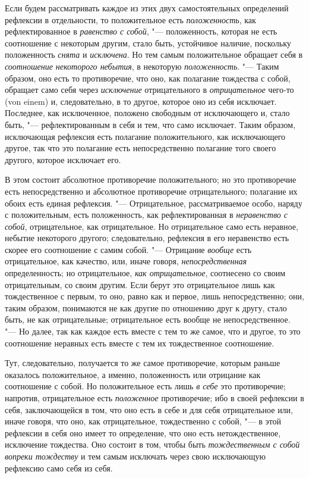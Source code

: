 Если будем рассматривать каждое из этих двух самостоятельных определений
рефлексии в отдельности, то положительное есть
{\em положенность}, как рефлектированное в
{\em равенство с собой}, "--- положенность, которая не
есть соотношение с некоторым другим, стало быть, устойчивое наличие,
поскольку положенность {\em снята} и
{\em исключена}. Но тем самым положительное обращает
себя в {\em соотношение некоторого небытия}, в
некоторую {\em положенность}. "--- Таким образом, оно есть
то противоречие, что оно, как полагание тождества с собой, обращает само
себя через {\em исключение} отрицательного в
{\em отрицательное} чего-то (von einem) и,
следовательно, в то другое, которое оно из себя исключает. Последнее, как
исключенное, положено свободным от исключающего и, стало быть, "---
рефлектированным в себя и тем, что само исключает. Таким образом,
исключающая рефлексия есть полагание положительного, как исключающего
другое, так что это полагание есть непосредственно полагание того своего
другого, которое исключает его.

В этом состоит абсолютное противоречие положительного; но это противоречие
есть непосредственно и абсолютное противоречие отрицательного; полагание их
обоих есть единая рефлексия. "--- Отрицательное, рассматриваемое особо, наряду
с положительным, есть положенность, как рефлектированная в
{\em неравенство с собой}, отрицательное, как
отрицательное. Но отрицательное само есть неравное, небытие некоторого
другого; следовательно, рефлексия в его неравенство есть скорее его
соотношение с самим собой. "--- Отрицание {\em вообще}
есть отрицательное, как качество, или, иначе говоря,
{\em непосредственная} определенность; но
отрицательное, {\em как отрицательное}, соотнесено со
своим отрицательным, со своим другим. Если берут это отрицательное лишь как
тождественное с первым, то оно, равно как и первое, лишь непосредственно;
они, таким образом, понимаются не как другие по отношению друг к другу,
стало быть, не как отрицательные; отрицательное есть вообще не
непосредственное. "--- Но далее, так как каждое есть вместе с тем то же самое,
что и другое, то это соотношение неравных есть вместе с тем их
тождественное соотношение.

Тут, следовательно, получается то же самое противоречие, которым раньше
оказалось положительное, а именно, положенность или отрицание как
соотношение с собой. Но положительное есть лишь {\em в себе} это
противоречие; напротив, отрицательное есть
{\em положенное} противоречие; ибо в своей рефлексии в
себя, заключающейся в том, что оно есть в себе и для себя отрицательное
или, иначе говоря, что оно, как отрицательное, тождественно
с собой, "--- в этой рефлексии в себя оно имеет то определение, что оно есть
нетождественное, исключение тождества. Оно состоит в том, чтобы быть
{\em тождественным с собой вопреки тождеству} и тем
самым исключать через свою исключающую рефлексию само себя из себя.

